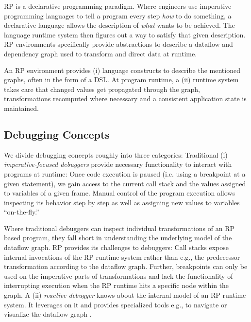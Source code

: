 \documentclass[12pt,a4paper]{article}
\begin{document}
RP is a declarative programming paradigm. Where engineers use imperative programming languages to tell a program every step \emph{how} to do something, a declarative language allows the description of \emph{what} wants to be achieved. The language runtime system then figures out a way to satisfy that given description. RP environments specifically provide abstractions to describe a dataflow and dependency graph used to transform and direct data at runtime.

An RP environment provides (i) language constructs to describe the mentioned graphs, often in the form of a DSL\cite{10.1145/2577080.2577083}. At program runtime, a (ii) runtime system takes care that changed values get propagated through the graph, transformations recomputed where necessary and a consistent application state is maintained.

\subsection{Debugging Concepts}

We divide debugging concepts roughly into three categories: Traditional (i) \emph{imperative-focused debuggers} provide necessary functionality to interact with programs at runtime: Once code execution is paused (i.e. using a breakpoint at a given statement), we gain access to the current call stack and the values assigned to variables of a given frame. Manual control of the program execution allows inspecting its behavior step by step as well as assigning new values to variables ``on-the-fly.''

Where traditional debuggers can inspect individual transformations of an RP based program, they fall short in understanding the underlying model of the dataflow graph. RP provides its challenges to debuggers: Call stacks expose internal invocations of the RP runtime system rather than e.g., the predecessor transformation according to the dataflow graph. Further, breakpoints can only be used on the imperative parts of transformations and lack the functionality of interrupting execution when the RP runtime hits a specific node within the graph. A (ii) \emph{reactive debugger} knows about the internal model of an RP runtime system. It leverages on it and provides specialized tools e.g., to navigate or visualize the dataflow graph \cite{10.1145/2884781.2884815} \cite{10.1145/3180155.3180156} \cite{rxviz}.
\end{document}
